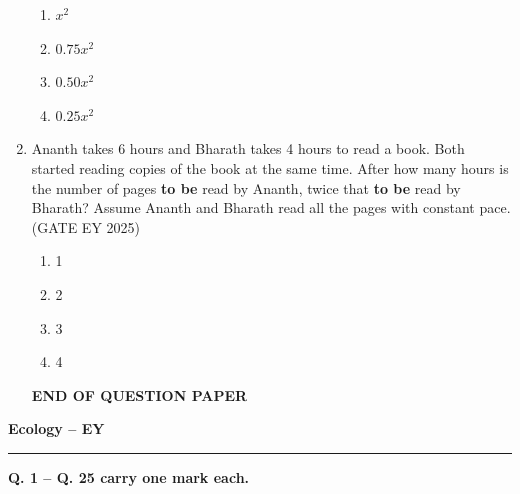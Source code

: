 \begin{enumerate}[leftmargin=*,label=\textbf{Q.\arabic*},resume]
\begin{multicols}{2}
\begin{enumerate}
\item $x^2$
\item $0.75 x^2$
\item $0.50 x^2$
\item $0.25 x^2$
\end{enumerate}
\end{multicols}

\item Ananth takes 6 hours and Bharath takes 4 hours to read a book. Both started reading copies of the book at the same time. After how many hours is the number of pages \textbf{to be} read by Ananth, twice that \textbf{to be} read by Bharath? Assume Ananth and Bharath read all the pages with constant pace.\hfill {(GATE EY 2025)}

\begin{multicols}{2}
\begin{enumerate}
\item 1
\item 2
\item 3
\item 4
\end{enumerate}
\end{multicols}
\begin{center}
  \textbf{END OF QUESTION PAPER}  
\end{center}

\end{enumerate}
\newpage
{}

\begin{center}
    {\Large \textbf{Ecology -- EY}}
\end{center}
\rule{\columnwidth}{0.4pt}


\noindent \textbf{Q. 1 -- Q. 25 carry one mark each.}

